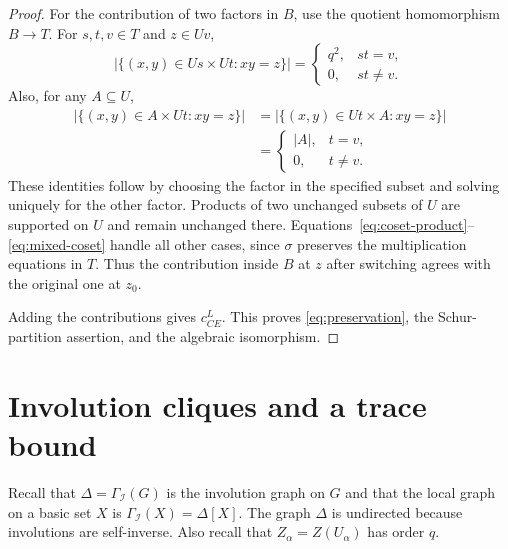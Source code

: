 \documentclass[11pt]{amsart}
\numberwithin{equation}{section}
\theoremstyle{definition}
\theoremstyle{remark}
\newcommand{\I}{\mathcal I}
\begin{document}
\begin{proof}
For the contribution of two factors in $B$, use the quotient
homomorphism $B\longrightarrow T$. For $s,t,v\in T$ and $z\in Uv$,
\begin{equation}\label{eq:coset-product}
 |\{(x,y)\in Us\times Ut:xy=z\}|=
 \begin{cases}q^2,&st=v,\\0,&st\ne v.\end{cases}
\end{equation}
Also, for any $A\subseteq U$,
\begin{equation}\label{eq:mixed-coset}
 \begin{split}
 |\{(x,y)\in A\times Ut:xy=z\}|
 &=|\{(x,y)\in Ut\times A:xy=z\}|\\
 &=\begin{cases}|A|,&t=v,\\0,&t\ne v.\end{cases}
 \end{split}
\end{equation}
These identities follow by choosing the factor in the specified subset
and solving uniquely for the other factor. Products of two unchanged
subsets of $U$ are supported on $U$ and remain unchanged there.
Equations~\eqref{eq:coset-product}--\eqref{eq:mixed-coset} handle all
other cases, since $\sigma$ preserves the multiplication equations in
$T$. Thus the contribution inside $B$ at $z$ after switching agrees
with the original one at $z_0$.

Adding the contributions gives $c_{CE}^{L}$. This proves
\eqref{eq:preservation}, the Schur-partition assertion, and the
algebraic isomorphism.
\end{proof}

\section{Involution cliques and a trace bound}

Recall that $\Delta = \Gamma_{\I}(G)$ is the involution graph on $G$ and that the
local graph on a basic set $X$ is $\Gamma_{\I}(X)=\Delta[X]$.
The graph $\Delta$ is
undirected because involutions are self-inverse. Also recall that
$Z_\alpha=Z(U_\alpha)$ has order $q$.
\end{document}

